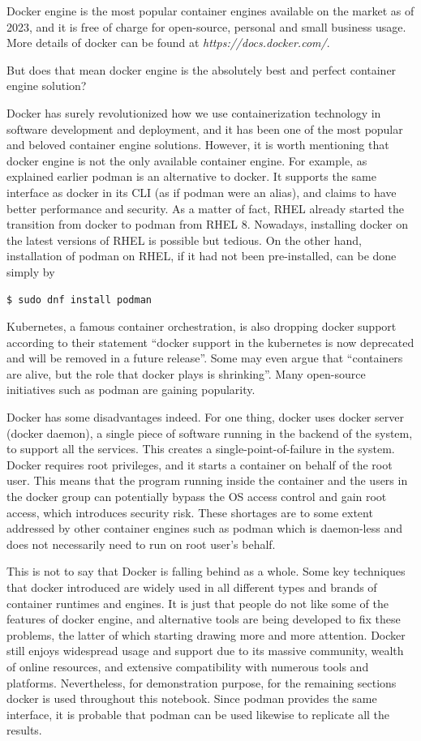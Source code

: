 Docker engine is the most popular container engines available on the market as of 2023, and it is free of charge for open-source, personal and small business usage. More details of docker can be found at \textit{https://docs.docker.com/}.

But does that mean docker engine is the absolutely best and perfect container engine solution?

Docker has surely revolutionized how we use containerization technology in software development and deployment, and it has been one of the most popular and beloved container engine solutions. However, it is worth mentioning that docker engine is not the only available container engine. For example, as explained earlier podman is an alternative to docker. It supports the same interface as docker in its CLI (as if podman were an alias), and claims to have better performance and security. As a matter of fact, RHEL already started the transition from docker to podman from RHEL 8. Nowadays, installing docker on the latest versions of RHEL is possible but tedious. On the other hand, installation of podman on RHEL, if it had not been pre-installed, can be done simply by
\begin{lstlisting}
$ sudo dnf install podman
\end{lstlisting}
Kubernetes, a famous container orchestration, is also dropping docker support according to their statement ``docker support in the kubernetes is now deprecated and will be removed in a future release''. Some may even argue that ``containers are alive, but the role that docker plays is shrinking''. Many open-source initiatives such as podman are gaining popularity.

Docker has some disadvantages indeed. For one thing, docker uses docker server (docker daemon), a single piece of software running in the backend of the system, to support all the services. This creates a single-point-of-failure in the system. Docker requires root privileges, and it starts a container on behalf of the root user. This means that the program running inside the container and the users in the docker group can potentially bypass the OS access control and gain root access, which introduces security risk. These shortages are to some extent addressed by other container engines such as podman which is daemon-less and does not necessarily need to run on root user's behalf.

This is not to say that Docker is falling behind as a whole. Some key techniques that docker introduced are widely used in all different types and brands of container runtimes and engines. It is just that people do not like some of the features of docker engine, and alternative tools are being developed to fix these problems, the latter of which starting drawing more and more attention. Docker still enjoys widespread usage and support due to its massive community, wealth of online resources, and extensive compatibility with numerous tools and platforms. Nevertheless, for demonstration purpose, for the remaining sections docker is used throughout this notebook. Since podman provides the same interface, it is probable that podman can be used likewise to replicate all the results.

